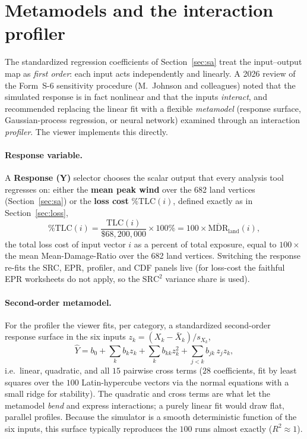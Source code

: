\documentclass[11pt]{article}
\begin{document}
\section{Metamodels and the interaction profiler}\label{sec:metamodel}
The standardized regression coefficients of Section~\ref{sec:sa} treat the
input--output map as \emph{first order}: each input acts independently and
linearly. A 2026 review of the Form~S-6 sensitivity procedure (M.~Johnson and
colleagues) noted that the simulated response is in fact nonlinear and that the
inputs \emph{interact}, and recommended replacing the linear fit with a flexible
\emph{metamodel} (response surface, Gaussian-process regression, or neural
network) examined through an interaction \emph{profiler}. The viewer implements
this directly.

\paragraph{Response variable.}
A \textbf{Response (Y)} selector chooses the scalar output that every analysis
tool regresses on: either the \textbf{mean peak wind} over the 682 land vertices
(Section~\ref{sec:sa}) or the \textbf{loss cost} $\%\text{TLC}(i)$, defined
exactly as in Section~\ref{sec:loss},
\[
\%\text{TLC}(i)=\frac{\text{TLC}(i)}{\$68{,}200{,}000}\times100\%
=100\times\overline{\text{MDR}}_{\text{land}}(i),
\]
the total loss cost of input vector $i$ as a percent of total exposure, equal to
$100\times$ the mean Mean-Damage-Ratio over the 682 land vertices. Switching the
response re-fits the SRC, EPR, profiler, and CDF panels live (for loss-cost the
faithful EPR worksheets do not apply, so the $\text{SRC}^2$ variance share is
used).

\paragraph{Second-order metamodel.}
For the profiler the viewer fits, per category, a standardized second-order
response surface in the six inputs $z_k=(X_k-\bar X_k)/s_{X_k}$,
\[
\hat Y=b_0+\sum_{k} b_k z_k+\sum_{k} b_{kk} z_k^{2}
        +\sum_{j<k} b_{jk}\,z_j z_k ,
\]
i.e.\ linear, quadratic, and all $15$ pairwise cross terms ($28$ coefficients,
fit by least squares over the $100$ Latin-hypercube vectors via the normal
equations with a small ridge for stability). The quadratic and cross terms are
what let the metamodel \emph{bend} and express interactions; a purely linear fit
would draw flat, parallel profiles. Because the simulator is a smooth
deterministic function of the six inputs, this surface typically reproduces the
$100$ runs almost exactly ($R^2\!\approx\!1$).
\end{document}

